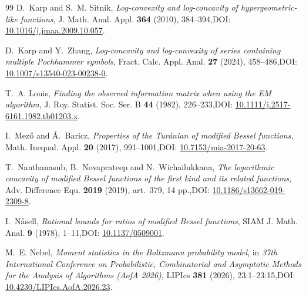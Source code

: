 \documentclass[11pt,a4paper]{amsart}
\numberwithin{equation}{section}
\theoremstyle{plain}
\theoremstyle{definition}
\begin{document}
\begin{thebibliography}{99}
D.~Karp and S.~M. Sitnik,
\emph{Log-convexity and log-concavity of hypergeometric-like functions},
J. Math. Anal. Appl. \textbf{364} (2010), 384--394,\newline DOI: \href{https://doi.org/10.1016/j.jmaa.2009.10.057}{10.1016/j.jmaa.2009.10.057}.

D.~Karp and Y.~Zhang,
\emph{Log-concavity and log-convexity of series containing multiple Pochhammer symbols},
Fract. Calc. Appl. Anal. \textbf{27} (2024), 458--486,\newline DOI: \href{https://doi.org/10.1007/s13540-023-00238-0}{10.1007/s13540-023-00238-0}.

T.~A. Louis,
\emph{Finding the observed information matrix when using the EM algorithm},
J. Roy. Statist. Soc. Ser. B \textbf{44} (1982), 226--233,\newline DOI: \href{https://doi.org/10.1111/j.2517-6161.1982.tb01203.x}{10.1111/j.2517-6161.1982.tb01203.x}.

I.~Mez\H{o} and \'{A}.~Baricz,
\emph{Properties of the Tur\'{a}nian of modified Bessel functions},
Math. Inequal. Appl. \textbf{20} (2017), 991--1001,\newline DOI: \href{https://doi.org/10.7153/mia-2017-20-63}{10.7153/mia-2017-20-63}.

T.~Nanthanasub, B.~Novaprateep and N.~Wichailukkana,
\emph{The logarithmic concavity of modified Bessel functions of the first kind and its related functions},
Adv. Difference Equ. \textbf{2019} (2019), art.~379, 14 pp.,\newline DOI: \href{https://doi.org/10.1186/s13662-019-2309-8}{10.1186/s13662-019-2309-8}.

I.~N\aa sell,
\emph{Rational bounds for ratios of modified Bessel functions},
SIAM J. Math. Anal. \textbf{9} (1978), 1--11,\newline DOI: \href{https://doi.org/10.1137/0509001}{10.1137/0509001}.

M.~E. Nebel,
\emph{Moment statistics in the Boltzmann probability model},
in \emph{37th International Conference on Probabilistic, Combinatorial and Asymptotic Methods for the Analysis of Algorithms (AofA 2026)},
LIPIcs \textbf{381} (2026), 23:1--23:15,\newline DOI: \href{https://doi.org/10.4230/LIPIcs.AofA.2026.23}{10.4230/LIPIcs.AofA.2026.23}.


\end{thebibliography}
\end{document}
